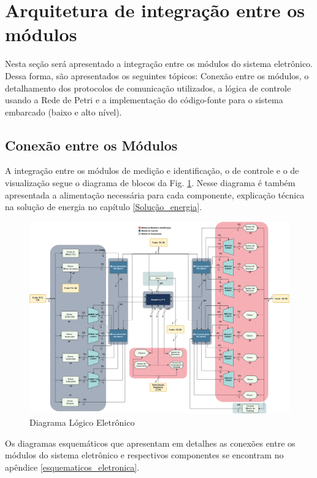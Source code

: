 \section{Arquitetura de integração entre os módulos}\label{sec:arq_eletronica}

Nesta seção será apresentado a integração entre os módulos do sistema eletrônico. Dessa forma, são apresentados os seguintes tópicos: Conexão entre os módulos, o detalhamento dos protocolos de comunicação utilizados, a lógica de controle usando a Rede de Petri e a implementação do código-fonte para o sistema embarcado (baixo e alto nível).

\subsection{Conexão entre os Módulos}

A integração entre os módulos de medição e identificação, o de controle e o de visualização segue o diagrama de blocos da Fig. \ref{fig:fluxograma_eletronica}. Nesse diagrama é também apresentada a alimentação necessária para cada componente, explicação técnica na solução de energia no capítulo \ref{Solução_energia}.

\begin{figure}[!htb]
    \centering
    \includegraphics[width=1.1\textwidth]{figuras/eletronica/fluxogramas/fluxograma_eletronica.png}
    \caption{Diagrama Lógico Eletrônico}
    \label{fig:fluxograma_eletronica}
\end{figure}

Os diagramas esquemáticos que apresentam em detalhes as conexões entre os módulos do sistema eletrônico e respectivos componentes se encontram no apêndice \ref{esquematicos_eletronica}.

